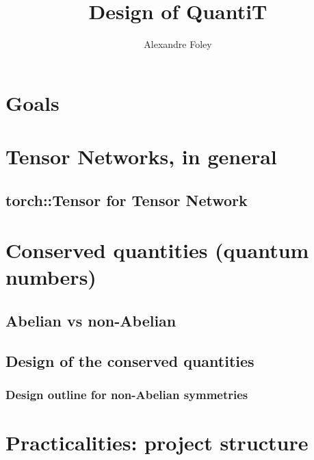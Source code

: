 \documentclass[15pt]{book}
\begin{document}
\title{Design of QuantiT}
\author{Alexandre Foley}

\maketitle

\tableofcontents
\chapter*{Goals}

\chapter{Tensor Networks, in general}

\section{torch::Tensor for Tensor Network}


\chapter{Conserved quantities (quantum numbers)}
\section{Abelian vs non-Abelian}
\section{Design of the conserved quantities}
\subsection{Design outline for non-Abelian symmetries}
\chapter{Practicalities: project structure}
\end{document}
